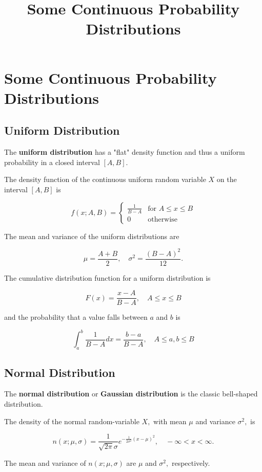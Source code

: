 \documentclass{article}
\title{Some Continuous Probability Distributions}
\begin{document}
\section{Some Continuous Probability Distributions}

\subsection{Uniform Distribution}

\begin{definition}
The \textbf{uniform distribution} has a "flat" density function and thus a uniform \@{probability} in a closed \@{interval} $[A, B]$.

The density function of the continuous uniform \@{random variable} $X$ on the interval $[A,B]$ is

\[ f(x; A, B) = \begin{cases}
\frac{1}{B - A} & \text{for } A \leq x \leq B \\
0 & \text{otherwise}
\end{cases} \]

The mean and \@{variance} of the uniform distributions are

\[ \mu = \frac{A + B}{2}, \quad \sigma^2 = \frac{(B-A)^2}{12}. \]

The \@{cumulative distribution function} for a uniform distribution is

\[ F(x) = \frac{x - A}{B - A}, \quad A \leq x \leq B \]

and the probability that a value falls between $a$ and $b$ is

\[ \int_{a}^{b} \frac{1}{B-A} dx = \frac{b - a}{B - A}, \quad A \leq a,b \leq B \]
\end{definition}

\subsection{Normal Distribution}

\begin{definition}
The \textbf{normal distribution} or \textbf{Gaussian distribution} is the classic bell-shaped distribution.

The density of the normal \@{random-variable} $X,$ with mean $\mu$ and \@{variance} $\sigma^2,$ is

\[ n(x; \mu, \sigma) = \frac{1}{\sqrt{2 \pi} \sigma}e^{-\frac{1}{2 \sigma^2}{(x - \mu)^2}}, \quad -\infty < x < \infty. \]

The mean and variance of $n(x; \mu, \sigma)$ are $\mu$ and $\sigma^2,$ respectively.
\end{definition}
\end{document}
